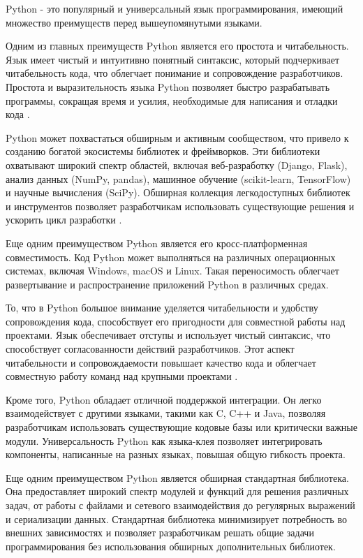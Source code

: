 Python - это популярный и универсальный язык программирования, имеющий множество преимуществ перед вышеупомянутыми языками.

Одним из главных преимуществ Python является его простота и читабельность. Язык имеет чистый и интуитивно понятный синтаксис, который подчеркивает читабельность кода, что облегчает понимание и сопровождение разработчиков. Простота и выразительность языка Python позволяет быстро разрабатывать программы, сокращая время и усилия, необходимые для написания и отладки кода \cite{py1}.

Python может похвастаться обширным и активным сообществом, что привело к созданию богатой экосистемы библиотек и фреймворков. Эти библиотеки охватывают широкий спектр областей, включая веб-разработку (Django, Flask), анализ данных (NumPy, pandas), машинное обучение (scikit-learn, TensorFlow) и научные вычисления (SciPy). Обширная коллекция легкодоступных библиотек и инструментов позволяет разработчикам использовать существующие решения и ускорить цикл разработки \cite{py2}.

Еще одним преимуществом Python является его кросс-платформенная совместимость. Код Python может выполняться на различных операционных системах, включая Windows, macOS и Linux. Такая переносимость облегчает развертывание и распространение приложений Python в различных средах.

То, что в Python большое внимание уделяется читабельности и удобству сопровождения кода, способствует его пригодности для совместной работы над проектами. Язык обеспечивает отступы и использует чистый синтаксис, что способствует согласованности действий разработчиков. Этот аспект читабельности и сопровождаемости повышает качество кода и облегчает совместную работу команд над крупными проектами \cite{py3}.

Кроме того, Python обладает отличной поддержкой интеграции. Он легко взаимодействует с другими языками, такими как C, C++ и Java, позволяя разработчикам использовать существующие кодовые базы или критически важные модули. Универсальность Python как языка-клея позволяет интегрировать компоненты, написанные на разных языках, повышая общую гибкость проекта.

Еще одним преимуществом Python является обширная стандартная библиотека. Она предоставляет широкий спектр модулей и функций для решения различных задач, от работы с файлами и сетевого взаимодействия до регулярных выражений и сериализации данных. Стандартная библиотека минимизирует потребность во внешних зависимостях и позволяет разработчикам решать общие задачи программирования без использования обширных дополнительных библиотек.

